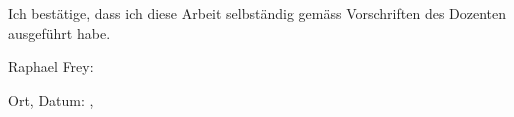 Ich best\"atige, dass ich diese Arbeit selbst\"andig gem\"ass Vorschriften des
Dozenten ausgef\"uhrt habe.

\vspace*{3em}

Raphael Frey:  \underline{\hspace{8cm}}

\vspace*{3em}

Ort, Datum:  \underline{\hspace{5cm}},  \underline{\hspace{4cm}}
